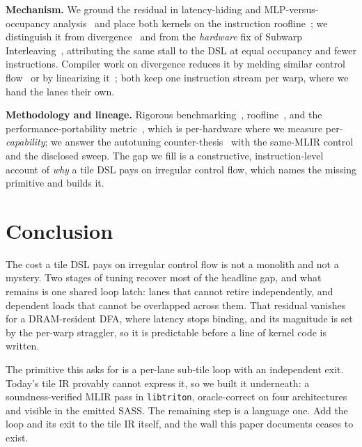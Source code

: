 \documentclass[sigplan,screen,review]{acmart}
\begin{document}
\textbf{Mechanism.} We ground the residual in latency-hiding and MLP-versus-occupancy
analysis~\cite{volkov2016latency,hongkim2009} and place both kernels on the instruction
roofline~\cite{instroofline2022}; we distinguish it from divergence~\cite{fung2007} and
from the \emph{hardware} fix of Subwarp Interleaving~\cite{subwarp2022}, attributing the
same stall to the DSL at equal occupancy and fewer instructions. Compiler work on
divergence reduces it by melding similar control flow~\cite{darm2022} or by linearizing
it~\cite{partialcfg2018}; both keep one instruction stream per warp, where we hand the
lanes their own.

\textbf{Methodology and lineage.} Rigorous benchmarking~\cite{hoefler2015},
roofline~\cite{roofline2009}, and the performance-portability metric~\cite{pennycook2016},
which is per-hardware where we measure per-\emph{capability}; we answer the autotuning
counter-thesis~\cite{ringlein2025} with the same-MLIR control and the disclosed sweep. The
gap we fill is a constructive, instruction-level account of \emph{why} a tile DSL pays on
irregular control flow, which names the missing primitive and builds it.

\section{Conclusion}
The cost a tile DSL pays on irregular control flow is not a monolith and not a mystery. Two
stages of tuning recover most of the headline gap, and what remains is one shared loop
latch: lanes that cannot retire independently, and dependent loads that cannot be
overlapped across them. That residual vanishes for a DRAM-resident DFA, where latency stops
binding, and its magnitude is set by the per-warp straggler, so it is predictable before a
line of kernel code is written.

The primitive this asks for is a per-lane sub-tile loop with an independent exit. Today's
tile IR provably cannot express it, so we built it underneath: a soundness-verified MLIR
pass in \texttt{libtriton}, oracle-correct on four architectures and visible in the emitted
SASS. The remaining step is a language one. Add the loop and its exit to the tile IR itself,
and the wall this paper documents ceases to exist.

\clearpage
\end{document}

